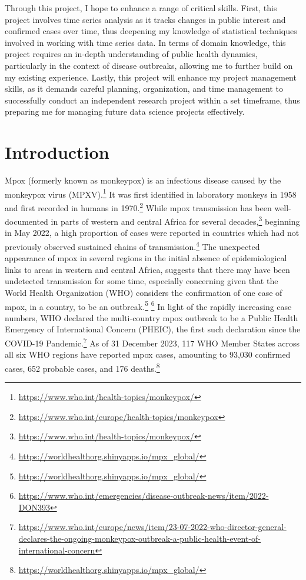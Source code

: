 \documentclass[
  letterpaper,
  DIV=11,
  numbers=noendperiod]{scrartcl}
\begin{document}
Through this project, I hope to enhance a range of critical skills.
First, this project involves time series analysis as it tracks changes
in public interest and confirmed cases over time, thus deepening my
knowledge of statistical techniques involved in working with time series
data. In terms of domain knowledge, this project requires an in-depth
understanding of public health dynamics, particularly in the context of
disease outbreaks, allowing me to further build on my existing
experience. Lastly, this project will enhance my project management
skills, as it demands careful planning, organization, and time
management to successfully conduct an independent research project
within a set timeframe, thus preparing me for managing future data
science projects effectively.

\hypertarget{introduction}{%
\section{Introduction}\label{introduction}}

Mpox (formerly known as monkeypox) is an infectious disease caused by
the monkeypox virus (MPXV).\footnote{\url{https://www.who.int/health-topics/monkeypox/}}
It was first identified in laboratory monkeys in 1958 and first recorded
in humans in 1970.\footnote{\url{https://www.who.int/europe/health-topics/monkeypox}}
While mpox transmission has been well-documented in parts of western and
central Africa for several decades,\footnote{\url{https://www.who.int/health-topics/monkeypox/}}
beginning in May 2022, a high proportion of cases were reported in
countries which had not previously observed sustained chains of
transmission.\footnote{\url{https://worldhealthorg.shinyapps.io/mpx_global/}}
The unexpected appearance of mpox in several regions in the initial
absence of epidemiological links to areas in western and central Africa,
suggests that there may have been undetected transmission for some time,
especially concerning given that the World Health Organization (WHO)
considers the confirmation of one case of mpox, in a country, to be an
outbreak.\footnote{\url{https://worldhealthorg.shinyapps.io/mpx_global/}}
\footnote{\url{https://www.who.int/emergencies/disease-outbreak-news/item/2022-DON393}}
In light of the rapidly increasing case numbers, WHO declared the
multi-country mpox outbreak to be a Public Health Emergency of
International Concern (PHEIC), the first such declaration since the
COVID-19 Pandemic.\footnote{\url{https://www.who.int/europe/news/item/23-07-2022-who-director-general-declares-the-ongoing-monkeypox-outbreak-a-public-health-event-of-international-concern}}
As of 31 December 2023, 117 WHO Member States across all six WHO regions
have reported mpox cases, amounting to 93,030 confirmed cases, 652
probable cases, and 176 deaths.\footnote{\url{https://worldhealthorg.shinyapps.io/mpx_global/}}
\end{document}
